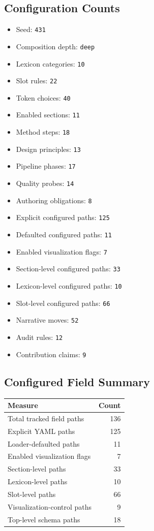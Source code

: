 \documentclass[
  english,
]{article}
\newcounter{none} %
\providecommand{\tightlist}{%
  \setlength{\itemsep}{0pt}\setlength{\parskip}{0pt}}
\begin{document}
\subsection{Configuration Counts}\label{configuration-counts}

\begin{itemize}
\tightlist
\item
  Seed: \texttt{431}
\item
  Composition depth: \texttt{deep}
\item
  Lexicon categories: \texttt{10}
\item
  Slot rules: \texttt{22}
\item
  Token choices: \texttt{40}
\item
  Enabled sections: \texttt{11}
\item
  Method steps: \texttt{18}
\item
  Design principles: \texttt{13}
\item
  Pipeline phases: \texttt{17}
\item
  Quality probes: \texttt{14}
\item
  Authoring obligations: \texttt{8}
\item
  Explicit configured paths: \texttt{125}
\item
  Defaulted configured paths: \texttt{11}
\item
  Enabled visualization flags: \texttt{7}
\item
  Section-level configured paths: \texttt{33}
\item
  Lexicon-level configured paths: \texttt{10}
\item
  Slot-level configured paths: \texttt{66}
\item
  Narrative moves: \texttt{52}
\item
  Audit rules: \texttt{12}
\item
  Contribution claims: \texttt{9}
\end{itemize}

\subsection{Configured Field Summary}\label{configured-field-summary}

{\def\LTcaptype{none} %
\begin{longtable}[]{@{}lr@{}}
\toprule\noalign{}
Measure & Count \\
\midrule\noalign{}
\endhead
\bottomrule\noalign{}
\endlastfoot
Total tracked field paths & 136 \\
Explicit YAML paths & 125 \\
Loader-defaulted paths & 11 \\
Enabled visualization flags & 7 \\
Section-level paths & 33 \\
Lexicon-level paths & 10 \\
Slot-level paths & 66 \\
Visualization-control paths & 9 \\
Top-level schema paths & 18 \\
\end{longtable}
}
\end{document}
